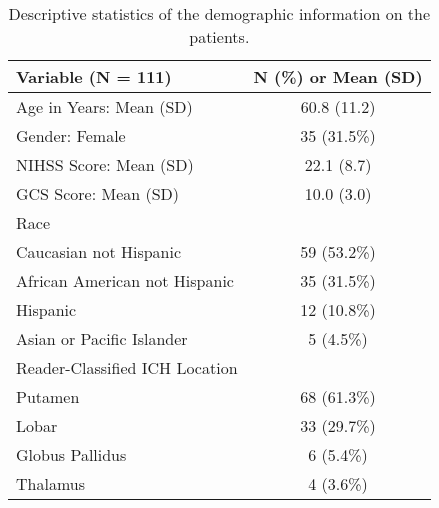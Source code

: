 \begin{table}[ht]
\centering
\begin{tabular}{lc}
  \hline {\bf Variable (N = 111)} & {\bf N (\%) or Mean (SD)} \\ 
  \hline
Age in Years: Mean (SD) & 60.8 (11.2) \\ 
   \hline
Gender: Female & 35 (31.5\%) \\ 
   \hline
NIHSS Score: Mean (SD) & 22.1 (8.7) \\ 
   \hline
GCS Score: Mean (SD) & 10.0 (3.0) \\ 
   \hline
Race &  \\ 
   \hline
\text{  } Caucasian not Hispanic & 59 (53.2\%) \\ 
   \hline
\text{  } African American not Hispanic & 35 (31.5\%) \\ 
   \hline
\text{  } Hispanic & 12 (10.8\%) \\ 
   \hline
\text{  } Asian or Pacific Islander & 5 (4.5\%) \\ 
   \hline
Reader-Classified ICH Location &  \\ 
   \hline
\text{  } Putamen & 68 (61.3\%) \\ 
   \hline
\text{  } Lobar & 33 (29.7\%) \\ 
   \hline
\text{  } Globus Pallidus & 6 (5.4\%) \\ 
   \hline
\text{  } Thalamus & 4 (3.6\%) \\ 
   \hline
\end{tabular}
\caption{Descriptive statistics of the demographic information on the patients.} 
\label{t:dem}
\end{table}
